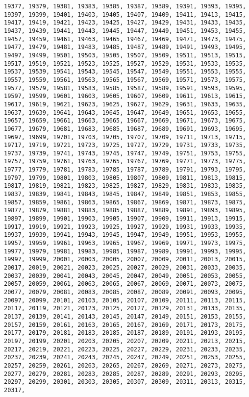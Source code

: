 \documentclass[11pt]{article}
\begin{document}
\begin{Verbatim}[commandchars=\\\{\}]
19377, 19379, 19381, 19383, 19385, 19387, 19389, 19391, 19393, 19395, 19397, 19399, 19401, 19403, 19405, 19407, 19409, 19411, 19413, 19415, 19417, 19419, 19421, 19423, 19425, 19427, 19429, 19431, 19433, 19435, 19437, 19439, 19441, 19443, 19445, 19447, 19449, 19451, 19453, 19455, 19457, 19459, 19461, 19463, 19465, 19467, 19469, 19471, 19473, 19475, 19477, 19479, 19481, 19483, 19485, 19487, 19489, 19491, 19493, 19495, 19497, 19499, 19501, 19503, 19505, 19507, 19509, 19511, 19513, 19515, 19517, 19519, 19521, 19523, 19525, 19527, 19529, 19531, 19533, 19535, 19537, 19539, 19541, 19543, 19545, 19547, 19549, 19551, 19553, 19555, 19557, 19559, 19561, 19563, 19565, 19567, 19569, 19571, 19573, 19575, 19577, 19579, 19581, 19583, 19585, 19587, 19589, 19591, 19593, 19595, 19597, 19599, 19601, 19603, 19605, 19607, 19609, 19611, 19613, 19615, 19617, 19619, 19621, 19623, 19625, 19627, 19629, 19631, 19633, 19635, 19637, 19639, 19641, 19643, 19645, 19647, 19649, 19651, 19653, 19655, 19657, 19659, 19661, 19663, 19665, 19667, 19669, 19671, 19673, 19675, 19677, 19679, 19681, 19683, 19685, 19687, 19689, 19691, 19693, 19695, 19697, 19699, 19701, 19703, 19705, 19707, 19709, 19711, 19713, 19715, 19717, 19719, 19721, 19723, 19725, 19727, 19729, 19731, 19733, 19735, 19737, 19739, 19741, 19743, 19745, 19747, 19749, 19751, 19753, 19755, 19757, 19759, 19761, 19763, 19765, 19767, 19769, 19771, 19773, 19775, 19777, 19779, 19781, 19783, 19785, 19787, 19789, 19791, 19793, 19795, 19797, 19799, 19801, 19803, 19805, 19807, 19809, 19811, 19813, 19815, 19817, 19819, 19821, 19823, 19825, 19827, 19829, 19831, 19833, 19835, 19837, 19839, 19841, 19843, 19845, 19847, 19849, 19851, 19853, 19855, 19857, 19859, 19861, 19863, 19865, 19867, 19869, 19871, 19873, 19875, 19877, 19879, 19881, 19883, 19885, 19887, 19889, 19891, 19893, 19895, 19897, 19899, 19901, 19903, 19905, 19907, 19909, 19911, 19913, 19915, 19917, 19919, 19921, 19923, 19925, 19927, 19929, 19931, 19933, 19935, 19937, 19939, 19941, 19943, 19945, 19947, 19949, 19951, 19953, 19955, 19957, 19959, 19961, 19963, 19965, 19967, 19969, 19971, 19973, 19975, 19977, 19979, 19981, 19983, 19985, 19987, 19989, 19991, 19993, 19995, 19997, 19999, 20001, 20003, 20005, 20007, 20009, 20011, 20013, 20015, 20017, 20019, 20021, 20023, 20025, 20027, 20029, 20031, 20033, 20035, 20037, 20039, 20041, 20043, 20045, 20047, 20049, 20051, 20053, 20055, 20057, 20059, 20061, 20063, 20065, 20067, 20069, 20071, 20073, 20075, 20077, 20079, 20081, 20083, 20085, 20087, 20089, 20091, 20093, 20095, 20097, 20099, 20101, 20103, 20105, 20107, 20109, 20111, 20113, 20115, 20117, 20119, 20121, 20123, 20125, 20127, 20129, 20131, 20133, 20135, 20137, 20139, 20141, 20143, 20145, 20147, 20149, 20151, 20153, 20155, 20157, 20159, 20161, 20163, 20165, 20167, 20169, 20171, 20173, 20175, 20177, 20179, 20181, 20183, 20185, 20187, 20189, 20191, 20193, 20195, 20197, 20199, 20201, 20203, 20205, 20207, 20209, 20211, 20213, 20215, 20217, 20219, 20221, 20223, 20225, 20227, 20229, 20231, 20233, 20235, 20237, 20239, 20241, 20243, 20245, 20247, 20249, 20251, 20253, 20255, 20257, 20259, 20261, 20263, 20265, 20267, 20269, 20271, 20273, 20275, 20277, 20279, 20281, 20283, 20285, 20287, 20289, 20291, 20293, 20295, 20297, 20299, 20301, 20303, 20305, 20307, 20309, 20311, 20313, 20315, 20317, 
\end{Verbatim}
\end{document}
